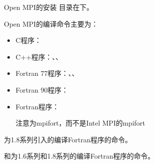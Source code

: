 \documentclass[a4paper,12pt,english]{sphinxmanual}
\begin{document}
\sphinxAtStartPar
Open MPI的安装  目录在下。

\sphinxAtStartPar
Open MPI的编译命令主要为：
\begin{itemize}
\item {} 
\sphinxAtStartPar
C程序：

\item {} 
\sphinxAtStartPar
C++程序：、、

\item {} 
\sphinxAtStartPar
Fortran 77程序：、、

\item {} 
\sphinxAtStartPar
Fortran 90程序：

\item {} 
\sphinxAtStartPar
Fortran程序： %
\begin{footnote}[3]\sphinxAtStartFootnote
注意为mpifort，而不是Intel MPI的mpifort
%
\end{footnote}

\end{itemize}

\sphinxAtStartPar
{}为1.8系列引入的编译Fortran程序的命令。

\sphinxAtStartPar
{}和为1.6系列和1.8系列的编译Fortran程序的命令。
\end{document}
